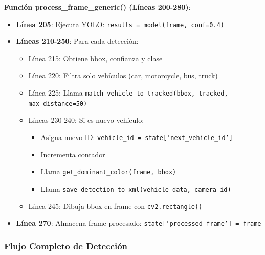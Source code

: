 \textbf{Función process\_frame\_generic() (Líneas 200-280)}:
\begin{itemize}
    \item \textbf{Línea 205}: Ejecuta YOLO: \texttt{results = model(frame, conf=0.4)}
    \item \textbf{Líneas 210-250}: Para cada detección:
    \begin{itemize}
        \item Línea 215: Obtiene bbox, confianza y clase
        \item Línea 220: Filtra solo vehículos (car, motorcycle, bus, truck)
        \item Línea 225: Llama \texttt{match\_vehicle\_to\_tracked(bbox, tracked, max\_distance=50)}
        \item Líneas 230-240: Si es nuevo vehículo:
        \begin{itemize}
            \item Asigna nuevo ID: \texttt{vehicle\_id = state['next\_vehicle\_id']}
            \item Incrementa contador
            \item Llama \texttt{get\_dominant\_color(frame, bbox)}
            \item Llama \texttt{save\_detection\_to\_xml(vehicle\_data, camera\_id)}
        \end{itemize}
        \item Línea 245: Dibuja bbox en frame con \texttt{cv2.rectangle()}
    \end{itemize}
    \item \textbf{Línea 270}: Almacena frame procesado: \texttt{state['processed\_frame'] = frame}
\end{itemize}

\subsubsection{Flujo Completo de Detección}

